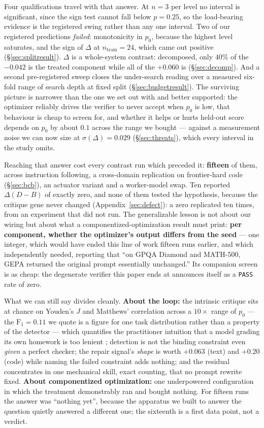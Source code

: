 \documentclass[11pt]{article}
\newcommand{\dd}{\ensuremath{\Delta}}
\begin{document}
Four qualifications travel with that answer. At $n=3$ per level no interval is significant, since
the sign test cannot fall below $p=0.25$, so the load-bearing evidence is the registered swing
rather than any one interval. Two of our registered predictions \emph{failed}: monotonicity in
$p_0$, because the highest level saturates, and the sign of $\dd$ at $n_{\mathrm{train}}{=}24$,
which came out positive (\S\ref{sec:splitresult}). $\dd$ is a whole-system contrast: decomposed,
only $40\%$ of the $-0.042$ is the treated component while all of the $+0.060$ is
(\S\ref{sec:decomp}). And a second pre-registered sweep closes the under-search reading over a
measured six-fold range of search depth at fixed split (\S\ref{sec:budgetresult}). The surviving
picture is narrower than the one we set out with and better supported: the optimizer reliably
drives the verifier to never accept when $p_0$ is low, that behaviour is cheap to screen for, and
whether it helps or hurts held-out score depends on $p_0$ by about $0.1$ across the range we
bought --- against a measurement noise we can now size at $\sigma(\dd) = 0.029$
(\S\ref{sec:threats}), which every interval in the study omits.

Reaching that answer cost every contrast run which preceded it: \textbf{fifteen} of them, across
instruction following, a cross-domain replication on frontier-hard code (\S\ref{sec:bcb}), an
actuator variant and a worker-model swap. Ten reported $\dd(D{-}B)$ of exactly zero, and none of
them tested the hypothesis, because the critique gene never changed
(Appendix~\ref{sec:defect}): a zero replicated ten times, from an experiment that did not run.
The generalizable lesson is not about our wiring but about what a componentized-optimization
result must print: \textbf{per component, whether the optimizer's output differs from the seed}
--- one integer, which would have ended this line of work fifteen runs earlier, and which
\citet{pappu2026multiagent} independently needed, reporting that ``on GPQA Diamond and MATH-500,
GEPA returned the original prompt essentially unchanged.'' Its companion screen is as cheap: the
degenerate verifier this paper ends at announces itself as a \texttt{PASS} rate of zero.

What we can still say divides cleanly. \textbf{About the loop:} the intrinsic critique sits at
chance on Youden's $J$ and Matthews' correlation across a $10\times$ range of $p_0$ --- the
$\mathrm{F}_1 = 0.11$ we quote is a figure for one task distribution rather than a property of the
detector --- which quantifies the practitioner intuition that a model grading its own homework is
too lenient \citep{osmani2026loop,kamoi2024whencan}; detection is not the binding constraint even
\emph{given} a perfect checker; the repair signal's \emph{shape} is worth $+0.063$ (text) and
$+0.20$ (code) while naming the failed constraint adds nothing; and the residual concentrates in
one mechanical skill, exact counting, that no prompt rewrite fixed. \textbf{About componentized
optimization:} one underpowered configuration in which the treatment demonstrably ran and bought
nothing. For fifteen runs the answer was ``nothing yet'', because the apparatus we built to answer
the question quietly answered a different one; the sixteenth is a first data point, not a verdict.
\end{document}
